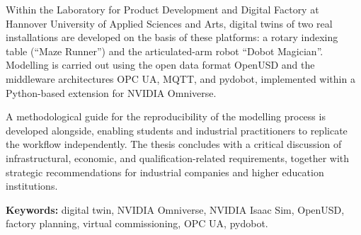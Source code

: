 Within the Laboratory for Product Development and Digital Factory at Hannover University of Applied Sciences and Arts, digital twins of two real installations are developed on the basis of these platforms: a rotary indexing table (\enquote{Maze Runner}) and the articulated-arm robot \enquote{Dobot Magician}. Modelling is carried out using the open data format OpenUSD and the middleware architectures OPC UA, MQTT, and pydobot, implemented within a Python-based extension for NVIDIA Omniverse.

A methodological guide for the reproducibility of the modelling process is developed alongside, enabling students and industrial practitioners to replicate the workflow independently. The thesis concludes with a critical discussion of infrastructural, economic, and qualification-related requirements, together with strategic recommendations for industrial companies and higher education institutions.

\textbf{Keywords:} digital twin, NVIDIA Omniverse, NVIDIA Isaac Sim, OpenUSD, factory planning, virtual commissioning, OPC UA, pydobot.\\
